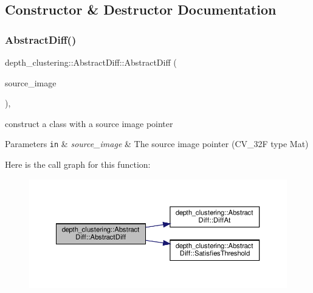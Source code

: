 \subsection{Constructor \& Destructor Documentation}
\mbox{\label{classdepth__clustering_1_1AbstractDiff_a14160500db5c2c1c1948a9e563318cc8}} 
\subsubsection{\texorpdfstring{Abstract\+Diff()}{AbstractDiff()}}
{\footnotesize\ttfamily depth\+\_\+clustering\+::\+Abstract\+Diff\+::\+Abstract\+Diff (\begin{DoxyParamCaption}\item[{const cv\+::\+Mat $\ast$}]{source\+\_\+image }\end{DoxyParamCaption})\hspace{0.3cm}{\ttfamily [inline]}, {\ttfamily [explicit]}}



construct a class with a source image pointer 


\begin{DoxyParams}[1]{Parameters}
\mbox{\tt in}  & {\em source\+\_\+image} & The source image pointer (C\+V\+\_\+32F type Mat) \\
\hline
\end{DoxyParams}
Here is the call graph for this function\+:\nopagebreak
\begin{figure}[H]
\begin{center}
\leavevmode
\includegraphics[width=350pt]{classdepth__clustering_1_1AbstractDiff_a14160500db5c2c1c1948a9e563318cc8_cgraph}
\end{center}
\end{figure}


